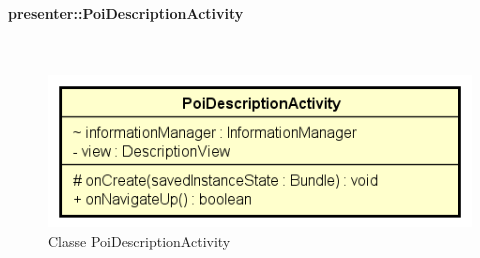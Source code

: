 \documentclass[../DefinizioneDiProdotto.tex]{subfiles}
\begin{document}
\paragraph{presenter::PoiDescriptionActivity}
\
\begin{figure}[H]
	\centering
	\includegraphics[width=\maxwidth]{img/PoiDescriptionActivity.png}
	\caption{Classe PoiDescriptionActivity}\label{fig:presenter::PoiDescriptionActivity} 
\end{figure}
\end{document}
